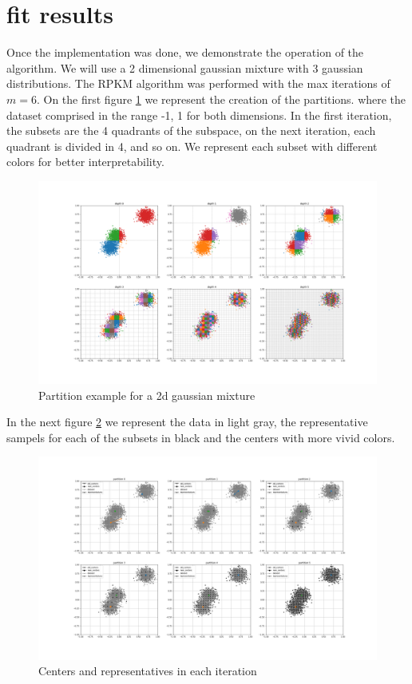 \section{fit results}

Once the implementation was done, we demonstrate the operation of the algorithm. We will use a 2 dimensional gaussian mixture with 3 gaussian distributions. The RPKM algorithm was performed with the max iterations of $m=6$. On the first figure \ref{fig:partitions2} we represent the creation of the partitions. where the dataset comprised in the range -1, 1 for both dimensions. In the first iteration, the subsets are the 4 quadrants of the subspace, on the next iteration, each quadrant is divided in 4, and so on. We represent each subset with different colors for better interpretability.

\begin{figure}[!ht]
    \includegraphics[width=\linewidth]{images/alldepths.png}
    \caption{Partition example for a 2d gaussian mixture}
    \label{fig:partitions2}
\end{figure}

In the next figure \ref{fig:steps} we represent the data in light gray, the representative sampels for each of the subsets in black and the centers with more vivid colors.

\begin{figure}[!ht]
    \includegraphics[width=\linewidth]{images/steps.png}
    \caption{Centers and representatives in each iteration}
    \label{fig:steps}
\end{figure}

